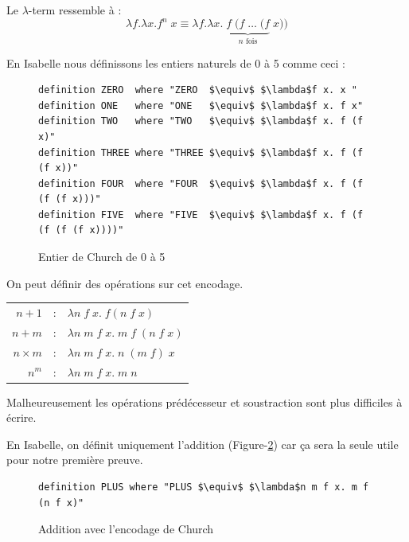 \documentclass{article}
\theoremstyle{plain}
\begin{document}
    Le $\lambda$-term ressemble à :
    $$
      \lambda f.\lambda x. f^n\;x \equiv 
      \lambda f.\lambda x.\;\underbrace{f\;(f\;\ldots\;(f}_{n\text{ fois}}\; x))
    $$

    En Isabelle nous définissons les entiers naturels de 0 à 5 comme ceci :

    \begin{figure}[thpb]
    \begin{lstlisting}
definition ZERO  where "ZERO  $\equiv$ $\lambda$f x. x "
definition ONE   where "ONE   $\equiv$ $\lambda$f x. f x"
definition TWO   where "TWO   $\equiv$ $\lambda$f x. f (f x)"
definition THREE where "THREE $\equiv$ $\lambda$f x. f (f (f x))"
definition FOUR  where "FOUR  $\equiv$ $\lambda$f x. f (f (f (f x)))"
definition FIVE  where "FIVE  $\equiv$ $\lambda$f x. f (f (f (f (f x))))"
    \end{lstlisting}
    \caption{Entier de Church de 0 à 5}
    \label{fig:number}
    \end{figure}

    On peut définir des opérations sur cet encodage.

  \begin{center}
    \begin{tabular}{r c l}
      $n + 1$      & : & $\lambda n\;f\;x.\;f (n\;f\;x)$          \\
      $n + m$      & : & $\lambda n\; m\;f\;x.\;m\; f\;(n\;f\;x)$ \\
      $n \times m$ & : & $\lambda n\; m\;f\;x.\;n\;(m\;f)\;x$     \\
      $n^m$        & : & $\lambda n\; m\;f\;x.\;m\; n$            \\
    \end{tabular}
  \end{center}

  Malheureusement les opérations prédécesseur et soustraction sont plus
  difficiles à écrire.

  En Isabelle, on définit uniquement l'addition (Figure-\ref{fig:add}) car ça
  sera la seule utile pour notre première preuve.

    \begin{figure}[thpb]
    \begin{lstlisting}
definition PLUS where "PLUS $\equiv$ $\lambda$n m f x. m f (n f x)"
    \end{lstlisting}
    \caption{Addition avec l'encodage de Church}
    \label{fig:add}
    \end{figure}
\end{document}
